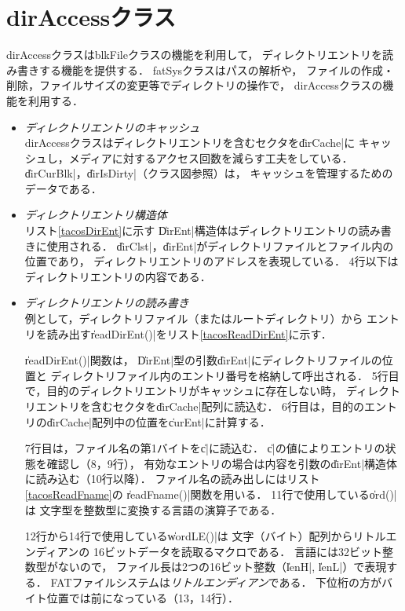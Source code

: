 \section{dirAccessクラス}
dirAccessクラスはblkFileクラスの機能を利用して，
ディレクトリエントリを読み書きする機能を提供する．
fatSysクラスはパスの解析や，
ファイルの作成・削除，ファイルサイズの変更等でディレクトリの操作で，
dirAccessクラスの機能を利用する．

\begin{itemize}
\item \emph{ディレクトリエントリのキャッシュ} \\
  dirAccessクラスはディレクトリエントリを含むセクタを\|dirCache|に
  キャッシュし，メディアに対するアクセス回数を減らす工夫をしている．
  \|dirCurBlk|，\|dirIsDirty|（クラス図参照）は，
  キャッシュを管理するためのデータである．

\item \emph{ディレクトリエントリ構造体} \\
  リスト\ref{tacosDirEnt}に示す
  \|DirEnt|構造体はディレクトリエントリの読み書きに使用される．
  \|dirClst|，\|dirEnt|がディレクトリファイルとファイル内の位置であり，
  ディレクトリエントリのアドレスを表現している．
  4行以下はディレクトリエントリの内容である．

  

\item \emph{ディレクトリエントリの読み書き} \\
  例として，ディレクトリファイル（またはルートディレクトリ）から
  エントリを読み出す\|readDirEnt()|をリスト\ref{tacosReadDirEnt}に示す．

  

  \|readDirEnt()|関数は，
  \|DirEnt|型の引数\|dirEnt|にディレクトリファイルの位置と
  ディレクトリファイル内のエントリ番号を格納して呼出される．
  5行目で，目的のディレクトリエントリがキャッシュに存在しない時，
  ディレクトリエントリを含むセクタを\|dirCache|配列に読込む．
  6行目は，目的のエントリの\|dirCache|配列中の位置を\|curEnt|に計算する．

  7行目は，ファイル名の第1バイトを\|c|に読込む．
  \|c|の値によりエントリの状態を確認し（8，9行），
  有効なエントリの場合は内容を引数の\|dirEnt|構造体に読み込む（10行以降）．
  ファイル名の読み出しにはリスト\ref{tacosReadFname}の
  \|readFname()|関数を用いる．
  11行で使用している\|ord()|は
  文字型を整数型に変換する{\cmm}言語の演算子である．

  12行から14行で使用している\|wordLE()|は
  文字（バイト）配列からリトルエンディアンの
  16ビットデータを読取るマクロである．
  {\cmm}言語には32ビット整数型がないので，
  ファイル長は2つの16ビット整数（\|lenH|, \|lenL|）で表現する．
  FATファイルシステムは\emph{リトルエンディアン}である．
  下位桁の方がバイト位置では前になっている（13，14行）．
\end{itemize}

